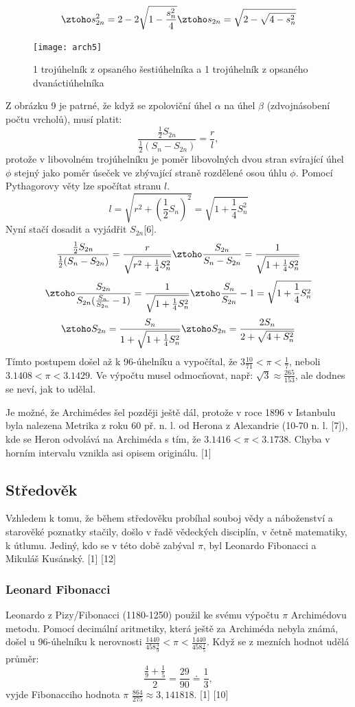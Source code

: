 \documentclass[rocnikovka]{gzwroc} %
\begin{document}
\begin{equation}
\ztoho s_{2n}^2=2-2\sqrt{1-\frac{s_n^2}{4}} \ztoho s_{2n}=\sqrt{2-\sqrt{4-s_n^2}}
\end{equation}
\begin{figure}[!ht]
\texttt{[image: arch5]}
\caption{1 trojúhelník z opsaného šestiúhelníka a 1 trojúhelník z opsaného dvanáctiúhelníka}
\label{fig:kruh}
\end{figure}
Z obrázku 9 je patrné, že když se zpoloviční úhel $\alpha$ na úhel $\beta$ (zdvojnásobení počtu vrcholů), musí platit:
$$
\frac{\frac{1}{2}S_{2n}}{\frac{1}{2}(S_n-S_{2n})}=\frac{r}{l},
$$
protože v libovolném trojúhelníku je poměr libovolných dvou stran svírající úhel $\phi$ stejný jako poměr úseček ve zbývající straně rozdělené osou úhlu $\phi$. Pomocí Pythagorovy věty lze spočítat stranu $l$.
$$
l=\sqrt{r^2+\left(\frac{1}{2}S_n\right)^2}=\sqrt{1+\frac{1}{4}S_n^2}
$$
Nyní stačí dosadit a vyjádřit $S_{2n}$[6].
$$
\frac{\frac{1}{2}S_{2n}}{\frac{1}{2}(S_n-S_{2n})}=\frac{r}{\sqrt{r^2+\frac{1}{4}S^2_n}} \ztoho \frac{S_{2n}}{S_n-S_{2n}}=\frac{1}{\sqrt{1+\frac{1}{4}S^2_n}}
$$
$$
\ztoho \frac{S_{2n}}{S_{2n}(\frac{S_n}{S_{2n}}-1)}=\frac{1}{\sqrt{1+\frac{1}{4}S^2_n}} \ztoho \frac{S_n}{S_{2n}}-1=\sqrt{1+\frac{1}{4}S^2_n}
$$
\begin{equation}
\ztoho S_{2n}=\frac{S_n}{1+\sqrt{1+\frac{1}{4}S^2_n}} \ztoho S_{2n}=\frac{2S_n}{2+\sqrt{4+S^2_n}} 
\end{equation}
Tímto postupem došel až k 96-úhelníku a vypočítal, že $3\frac{10}{71}<\pi <\frac{1}{7}$, neboli $3.1408<\pi <3.1429$. Ve výpočtu musel odmocňovat, např: $\sqrt{3}\approx \frac{265}{153}$, ale dodnes se neví, jak to udělal.

Je možné, že Archimédes šel později ještě dál, protože v roce 1896 v Istanbulu byla nalezena Metrika z roku 60 př. n. l. od Herona z Alexandrie (10-70 n. l. [7]), kde se Heron odvolává na Archiméda s tím, že $3.1416<\pi <3.1738$. Chyba v horním intervalu vznikla asi opisem originálu. [1]
\subsection{Středověk}
Vzhledem k tomu, že během středověku probíhal souboj vědy a náboženství a starověké poznatky stačily, došlo v řadě vědeckých disciplín, v četně matematiky, k útlumu. Jediný, kdo se v této době zabýval $\pi$, byl Leonardo Fibonacci a Mikuláš Kusánský. [1] [12]
\subsubsection{Leonard Fibonacci}
Leonardo z Pizy/Fibonacci (1180-1250) použil ke svému výpočtu $\pi$ Archimédovu metodu. Pomocí decimální aritmetiky, která ještě za Archiméda nebyla známá, došel u 96-úhelníku k nerovnosti $\frac{1440}{458\frac{4}{9}}<\pi<\frac{1440}{458\frac{1}{5}}$. Když se z mezních hodnot udělá průměr:
$$
\frac{\frac{4}{9}+\frac{1}{5}}{2}=\frac{29}{90}\doteq\frac{1}{3},
$$
vyjde Fibonacciho hodnota $\pi$ $\frac{864}{275}\approx 3,141818$. [1] [10]
\end{document}
